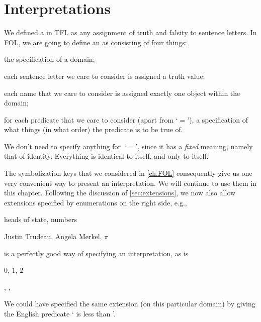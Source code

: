 \section{Interpretations}
We defined a  in TFL as any assignment of truth and falsity to sentence letters. In FOL, we are going to define an  as consisting of four things:
	\begin{compactlist}
		\item the specification of a domain;
		\item each sentence letter we care to consider is assigned a truth value;
		\item each name that we care to consider is assigned exactly one object within the domain;
		\item for each predicate that we care to consider (apart from
		`$=$'), a specification of what things (in what order) the
		predicate is to be true of.
	\end{compactlist}
We don't need to specify anything for~`$=$', since it has a
\emph{fixed} meaning, namely that of identity. Everything is identical
to itself, and only to itself. 

The symbolization keys that we considered in \cref{ch.FOL} consequently give us one very convenient way to present an interpretation. We will continue to use them in this chapter. Following the discussion of \cref{sec:extensions}, we now also allow extensions specified by enumerations on the right side, e.g.,
\begin{ekey}
	\item[\text{domain}] heads of state, numbers
	\item[\atom{H}{x}] Justin Trudeau, Angela Merkel, $\pi$
\end{ekey}
is a perfectly good way of specifying an interpretation, as is
\begin{ekey}
	\item[\text{domain}] $0$, $1$, $2$
	\item[\atom{L}{x,y}] , , 
\end{ekey}
We could have specified the same extension (on this particular domain) by giving the English predicate ` is less than '.



